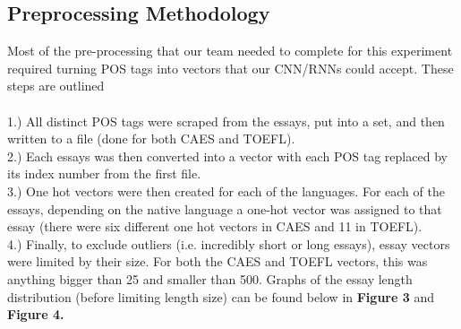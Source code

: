 \documentclass[12pt]{article}
\newcommand\tab[1][1cm]{\hspace*{#1}}
\begin{document}
 \subsection{Preprocessing Methodology}
 \tab Most of the pre-processing that our team needed to complete for this experiment required turning POS tags into vectors that our CNN/RNNs could accept. These steps are outlined\\
 \\
 1.) All distinct POS tags were scraped from the essays, put into a set, and then written to a file (done for both CAES and TOEFL).\\
 2.) Each essays was then converted into a vector with each POS tag replaced by its index number from the first file.\\
 3.) One hot vectors were then created for each of the languages. For each of the essays, depending on the native language a  one-hot vector was assigned to that essay (there were six different one hot vectors in CAES and 11 in TOEFL).\\
 4.) Finally, to exclude outliers (i.e. incredibly short or long essays), essay vectors were limited by their size. For both the CAES and TOEFL vectors, this was anything bigger than 25 and smaller than 500. Graphs of the essay length distribution (before limiting length size) can be found below in \textbf{Figure 3} and \textbf{Figure 4.}
\end{document}
